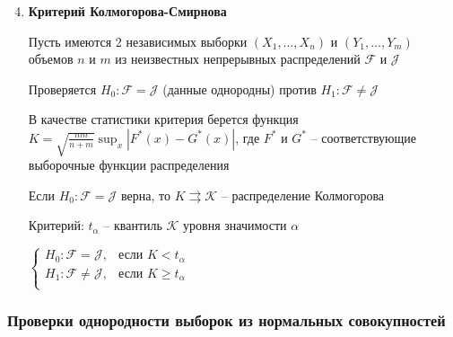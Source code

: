 \begin{enumerate}[label*=\Roman*. ]
    \setcounter{enumi}{3}

    \hypertarget{kolmogorovs_smirnovs_criterion}{}

    \item \textbf{Критерий Колмогорова-Смирнова}

    Пусть имеются 2 независимых выборки $(X_1, \dots, X_n)$ и $(Y_1, \dots, Y_m)$ объемов $n$ и $m$ из неизвестных непрерывных распределений $\mathcal{F}$ и $\mathcal{J}$

    Проверяется $H_0 : \mathcal{F} = \mathcal{J}$ (данные однородны) против $H_1 : \mathcal{F} \neq \mathcal{J}$

    В качестве статистики критерия берется функция $K = \sqrt{\frac{nm}{n + m}} \sup_x |F^*(x) - G^*(x)|$, где $F^*$ и $G^*$ -- 
    соответствующие выборочные функции распределения

    \begin{MyTheorem}

        Если $H_0 : \mathcal{F} = \mathcal{J}$ верна, то $K \rightrightarrows \mathcal{K}$ -- распределение Колмогорова
    \end{MyTheorem}

    Критерий: $t_\alpha$ -- квантиль $\mathcal{K}$ уровня значимости $\alpha$

    $\begin{cases}
        H_0 : \mathcal{F} = \mathcal{J}, & \text{если } K < t_\alpha \\
        H_1 : \mathcal{F} \neq \mathcal{J}, & \text{если } K \geq t_\alpha \\
    \end{cases}$

\end{enumerate}

\subsubsection{Проверки однородности выборок из нормальных совокупностей}


